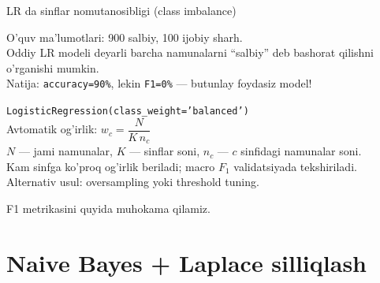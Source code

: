 \documentclass[aspectratio=169,11pt]{beamer}
\begin{document}
\begin{frame}{LR da sinflar nomutanosibligi (class imbalance)}
  \begin{tcolorbox}[warnbox,title=Muammo]
    \small
    O'quv ma'lumotlari: 900 salbiy, 100 ijobiy sharh.\\
    Oddiy LR modeli deyarli barcha namunalarni ``salbiy'' deb bashorat qilishni o'rganishi mumkin.\\
    Natija: \texttt{accuracy=90\%}, lekin \texttt{F1=0\%}
    --- butunlay foydasiz model!
  \end{tcolorbox}
  \vspace{6pt}
  \begin{tcolorbox}[okbox,title={Yechim: \texttt{class\_weight='balanced'}}]
    \small
    \texttt{LogisticRegression(class\_weight='balanced')}\\[4pt]
    Avtomatik og'irlik:\quad
    $w_c = \dfrac{N}{K\,n_c}$\\[2pt]
    \footnotesize $N$ --- jami namunalar, $K$ --- sinflar soni,
    $n_c$ --- $c$ sinfidagi namunalar soni.\\[2pt]
    \textcolor{halfgray}{\footnotesize
      Kam sinfga ko'proq og'irlik beriladi; macro $F_1$ validatsiyada tekshiriladi.\\
      Alternativ usul: oversampling yoki threshold tuning.}
  \end{tcolorbox}
  \vspace{4pt}
  \small\textcolor{halfgray}{F1 metrikasini quyida muhokama qilamiz.}
\end{frame}

\section[Naive Bayes]{Naive Bayes + Laplace silliqlash}
\end{document}
